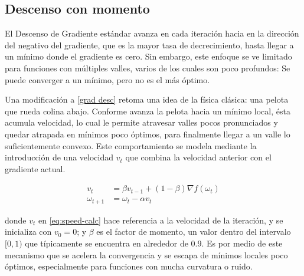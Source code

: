 \documentclass[conference]{IEEEtran}
\begin{document}
\subsection{Descenso con momento}\label{sec:momentum}
El Descenso de Gradiente estándar avanza en cada iteración hacia en la dirección del negativo del gradiente, que es la mayor tasa de decrecimiento, hasta llegar a un mínimo donde el gradiente es cero. Sin embargo, este enfoque se ve limitado para funciones con múltiples valles, varios de los cuales son poco profundos: Se puede converger a un mínimo, pero no es el más óptimo.

Una modificación a \eqref{grad desc} retoma una idea de la física clásica: una pelota que rueda colina abajo. Conforme avanza la pelota hacia un mínimo local, ésta acumula velocidad, lo cual le permite atravesar valles pocos pronunciados y quedar atrapada en mínimos poco óptimos, para finalmente llegar a un valle lo suficientemente convexo. Este comportamiento se modela mediante la introducción de una velocidad $v_t$ que combina la velocidad anterior con el gradiente actual.

\begin{align}
    v_{t} &= \beta v_{t-1} + (1-\beta)\nabla f(\omega_t) \label{eq:speed-calc} \\
    \omega_{t+1} &= \omega_{t} - \alpha v_{t}
    \label{eq:step-with-speed}
\end{align}

donde $v_{t}$ en \eqref{eq:speed-calc} hace referencia a la velocidad de la iteración, y se inicializa con $v_0=0$; y $\beta$ es el factor de momento, un valor dentro del intervalo $[0,1)$ que típicamente se encuentra en alrededor de 0.9. Es por medio de este mecanismo que se acelera la convergencia y se escapa de mínimos locales poco óptimos, especialmente para funciones con mucha curvatura o ruido.
\end{document}
